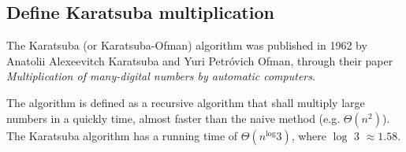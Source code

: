 \subsection{Define Karatsuba multiplication}

The Karatsuba (or Karatsuba-Ofman) algorithm was published in 1962 by Anatolii Alexeevitch Karatsuba and Yuri Petróvich Ofman, through their paper \textit{Multiplication of many-digital numbers by automatic computers}. 

The algorithm is defined as a recursive algorithm that shall multiply large numbers in a quickly time, almost faster than the naive method (e.g. $\Theta(n^2)$). The Karatsuba algorithm has a running time of ${\Theta(n^\log 3)}$, where ${\log}$ 3 $\approx 1.58$.



